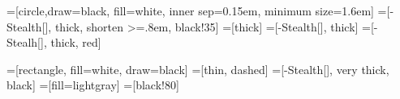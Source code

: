 \usetikzlibrary{arrows.meta}
\usetikzlibrary{shapes.arrows}
\usetikzlibrary{arrows}

=[circle,draw=black, fill=white, inner sep=0.15em, minimum size=1.6em]
=[{}-{Stealth[]}, thick, shorten >=.8em, black!35]
=[thick]
=[{}-{Stealth[]}, thick]
=[{}-{Stealh[]}, thick, red]

=[rectangle, fill=white, draw=black]
=[thin, dashed]
=[-{Stealth[]}, very thick, black]
=[fill=lightgray]
=[black!80]